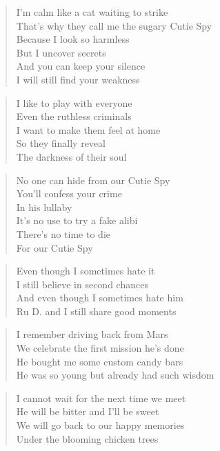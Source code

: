 \begin{verse}
I'm calm like a cat waiting to strike\\
That's why they call me the sugary Cutie Spy\\
Because I look so harmless\\
But I uncover secrets\\
And you can keep your silence \\
I will still find your weakness
\end{verse}

\begin{verse}
I like to play with everyone\\
Even the ruthless criminals\\
I want to make them feel at home\\
So they finally reveal \\
The darkness of their soul
\end{verse}

\begin{verse}
No one can hide from our Cutie Spy\\
You'll confess your crime \\
In his lullaby\\
It's no use to try a fake alibi\\
There's no time to die\\
For our Cutie Spy
\end{verse}

\begin{verse}
Even though I sometimes hate it\\
I still believe in second chances\\
And even though I sometimes hate him\\
Ru D. and I still share good moments
\end{verse}

\begin{verse}
I remember driving back from Mars\\
We celebrate the first mission he's done\\
He bought me some custom candy bars\\
He was so young but already had such wisdom
\end{verse}

\clearpage
{}

\begin{verse}
I cannot wait for the next time we meet\\
He will be bitter and I'll be sweet\\
We will go back to our happy memories\\
Under the blooming chicken trees
\end{verse}

